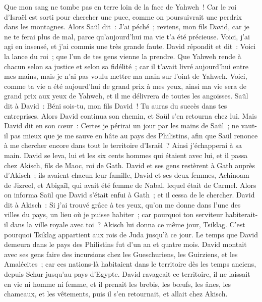 \begin{multicols}{2}
Que mon sang ne tombe pas en terre loin de la face de Yahweh~! Car le roi d'Israël est sorti pour chercher une puce, comme on poursuivrait une perdrix dans les montagnes.
Alors Saül dit~: J'ai péché~; reviens, mon fils David, car je ne te ferai plus de mal, parce qu'aujourd'hui ma vie t'a été précieuse. Voici, j'ai agi en insensé, et j'ai commis une très grande faute.
David répondit et dit~: Voici la lance du roi~; que l'un de tes gens vienne la prendre.
Que Yahweh rende à chacun selon sa justice et selon sa fidélité~; car il t'avait livré aujourd'hui entre mes mains, mais je n'ai pas voulu mettre ma main sur l'oint de Yahweh.
Voici, comme ta vie a été aujourd'hui de grand prix à mes yeux, ainsi ma vie sera de grand prix aux yeux de Yahweh, et il me délivrera de toutes les angoisses.
Saül dit à David~: Béni sois-tu, mon fils David~! Tu auras du succès dans tes entreprises. Alors David continua son chemin, et Saül s'en retourna chez lui.
\VerseOne{}Mais David dit en son cœur~: Certes je périrai un jour par les mains de Saül~; ne vaut-il pas mieux que je me sauve en hâte au pays des Philistins, afin que Saül renonce à me chercher encore dans tout le territoire d'Israël~? Ainsi j'échapperai à sa main.
David se leva, lui et les six cents hommes qui étaient avec lui, et il passa chez Akisch, fils de Maoc, roi de Gath.
David et ses gens restèrent à Gath auprès d'Akisch~; ils avaient chacun leur famille, David et ses deux femmes, Achinoam de Jizreel, et Abigaïl, qui avait été femme de Nabal, lequel était de Carmel.
Alors on informa Saül que David s'était enfui à Gath~; et il cessa de le chercher.
David dit à Akisch~: Si j'ai trouvé grâce à tes yeux, qu'on me donne dans l'une des villes du pays, un lieu où je puisse habiter~; car pourquoi ton serviteur habiterait-il dans la ville royale avec toi~?
Akisch lui donna ce même jour, Tsiklag. C'est pourquoi Tsiklag appartient aux rois de Juda jusqu'à ce jour.
Le temps que David demeura dans le pays des Philistins fut d'un an et quatre mois.
David montait avec ses gens faire des incursions chez les Gueschuriens, les Guirziens, et les Amalécites~; car ces nations-là habitaient dans le territoire dès les temps anciens, depuis Schur jusqu'au pays d'Egypte.
David ravageait ce territoire, il ne laissait en vie ni homme ni femme, et il prenait les brebis, les bœufs, les ânes, les chameaux, et les vêtements, puis il s'en retournait, et allait chez Akisch.

\end{multicols}
